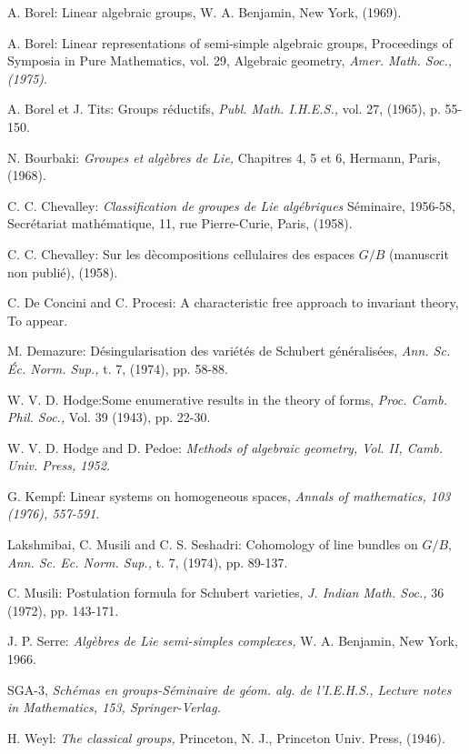 \begin{thebibliography}{99}
 A. Borel: Linear algebraic groups, W. A. Benjamin, New York, (1969).

 A. Borel: Linear representations of semi-simple algebraic groups, Proceedings of Symposia in Pure Mathematics, vol. 29, Algebraic geometry, {\em Amer. Math. Soc., (1975)}.

 A. Borel et J. Tits: Groups r\'eductifs, {\em Publ. Math. I.H.E.S.,} vol. 27, (1965), p. 55-150. 

 N. Bourbaki: {\em Groupes et alg\`ebres de Lie,} Chapitres 4, 5 et 6, Hermann, Paris, (1968).

 C. C. Chevalley: {\em Classification de groupes de Lie alg\'ebriques } S\'eminaire, 1956-58, Secr\'etariat math\'ematique, 11, rue Pierre-Curie, Paris, (1958).

 C. C. Chevalley: Sur les d\`ecompositions cellulaires des espaces $G/B$ (manuscrit non publi\'e), (1958).

 C. De Concini and C. Procesi: A characteristic free approach to invariant theory, To appear.

 M. Demazure: D\'esingularisation des vari\'et\'es de Schubert g\'en\'eralis\'ees, {\em Ann. Sc. \'Ec. Norm. Sup., } t. 7, (1974), pp. 58-88.

 W. V. D. Hodge:\pageoriginale Some enumerative results in the theory of forms, {\em Proc. Camb. Phil. Soc.,} Vol. 39 (1943), pp. 22-30.

 W. V. D. Hodge and D. Pedoe: {\em Methods of algebraic geometry, Vol. II, Camb. Univ. Press, 1952.}

 G. Kempf: Linear systems on homogeneous spaces, {\em Annals of mathematics, 103 (1976), 557-591}.

 Lakshmibai, C. Musili and C. S. Seshadri: Cohomology of line bundles on $G/B$, {\em Ann. Sc. Ec. Norm. Sup.,} t. 7, (1974), pp. 89-137.

 C. Musili: Postulation formula for Schubert varieties, {\em J. Indian Math. Soc.,} 36 (1972), pp. 143-171.

 J. P. Serre: {\em Alg\`ebres de Lie semi-simples complexes,} W. A. Benjamin, New York, 1966. 

 SGA-3, {\em Sch\'emas en groups-S\'eminaire de g\'eom. alg. de l'I.E.H.S., Lecture notes in Mathematics, 153, Springer-Verlag.}

 H. Weyl: {\em The classical groups,} Princeton, N. J., Princeton Univ. Press, (1946).

\end{thebibliography}


\vfill\eject
~\phantom{a}
\thispagestyle{empty}
